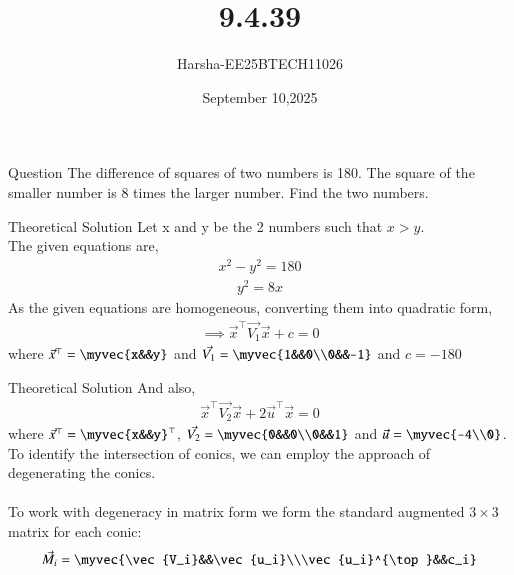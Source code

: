 \documentclass{beamer}
\title %
{9.4.39}
\date{September 10,2025}
\author %
{Harsha-EE25BTECH11026}
\begin{document}
\frame{\titlepage}


\begin{frame}{Question}
The difference of squares of two numbers is 180. The square of the smaller number is 8 times the larger number. Find the two numbers.
\end{frame}

\begin{frame}{Theoretical Solution}
Let x and y be the 2 numbers such that $x>y$.\\
The given equations are,
\begin{align}
    x^2-y^2=180 \label{eq:1}
\end{align}
\begin{align}
    y^2=8x \label{eq:2}
\end{align}
As the given equations are homogeneous, converting them into quadratic form,
\begin{align}
    \implies \vec{x}^{\top}\vec{V_1}\vec{x}+c=0 \label{eq:3}
\end{align}
where $\vec{x}^{\top}=\myvec{x&&y}$ and $\vec{V_1}=\myvec{1&&0\\0&&-1}$ and $c=-180$
\end{frame}

\begin{frame}{Theoretical Solution}
And also,
\begin{align}
    \vec{x}^{\top}\vec{V_2}\vec{x}+2\vec{u}^{\top}\vec{x}=0 \label{eq:4}
\end{align}
where $\vec{x}^{\top}=\myvec{x&&y}^{\top}$, $\vec{V_2}=\myvec{0&&0\\0&&1}$ and $\vec{u}=\myvec{-4\\0}$.\\
To identify the intersection of conics, we can employ the approach of degenerating the conics.\\
\\
To work with degeneracy in matrix form we form the standard augmented $3 \times 3$ matrix for each conic:
\begin{align}
    \vec{M_i}=\myvec{\vec{V_i}&&\vec{u_i}\\\vec{u_i}^{\top}&&c_i} \label{eq:5}
\end{align}
\end{frame}
\end{document}
